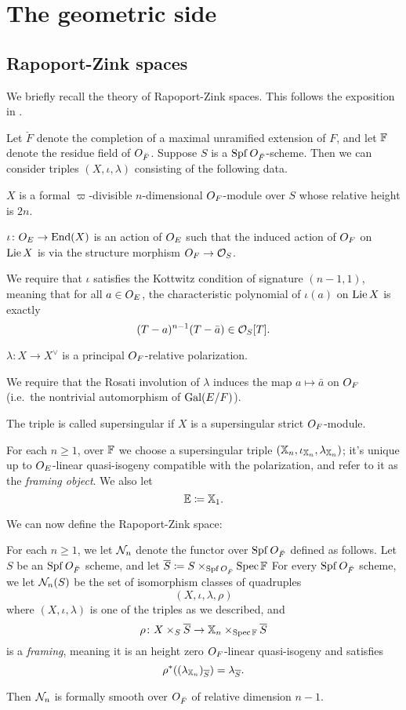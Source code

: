 \section{The geometric side}
\label{sec:geo}

\subsection{Rapoport-Zink spaces}
We briefly recall the theory of Rapoport-Zink spaces.
This follows the exposition in \cite[\S4.1]{ref:survey}.

Let $\breve F$ denote the completion of a maximal unramified extension of $F$,
and let $\mathbb F$ denote the residue field of $O_{\breve F}$.
Suppose $S$ is a $\operatorname{Spf} O_{\breve F}$-scheme.
Then we can consider triples $(X, \iota, \lambda)$ consisting of the following data.
\begin{itemize}
  \ii $X$ is a formal $\varpi$-divisible $n$-dimensional $O_F$-module over $S$
  whose relative height is $2n$.

  \ii $\iota \colon O_E \to \operatorname{End}(X)$ is an action of $O_E$
  such that the induced action of $O_F$ on $\operatorname{Lie} X$
  is via the structure morphism $O_F \to \mathcal{O}_S$.

  We require that $\iota$ satisfies the Kottwitz condition of signature $(n-1,1)$,
  meaning that for all $a \in O_E$,
  the characteristic polynomial of $\iota(a)$ on $\operatorname{Lie} X$
  is exactly \[ (T-a)^{n-1} (T-\bar a) \in \mathcal{O}_S[T]. \]

  \ii $\lambda \colon X \to X^\vee$ is a principal $O_F$-relative polarization.

  We require that the Rosati involution of $\lambda$
  induces the map $a \mapsto \bar a$ on $O_F$
  (i.e.\ the nontrivial automorphism of $\operatorname{Gal}(E/F)$).
\end{itemize}
The triple is called supersingular if $X$ is a supersingular strict $O_F$-module.

For each $n \ge 1$, over $\mathbb F$
we choose a supersingular triple $(\mathbb X_n, \iota_{\mathbb X_n}, \lambda_{\mathbb X_n})$;
it's unique up to $O_E$-linear quasi-isogeny compatible with the polarization,
and refer to it as the \emph{framing object}.
We also let \[ \mathbb E \coloneqq \mathbb X_1. \]

We can now define the Rapoport-Zink space:
\begin{definition}
  For each $n \ge 1$, we let $\mathcal N_n$ denote the
  functor over $\operatorname{Spf} O_{\breve F}$ defined as follows.
  Let $S$ be an $\operatorname{Spf} O_{\breve F}$ scheme, and let
  $\overline S \coloneqq S \times_{\operatorname{Spf} O_{\breve F}} \operatorname{Spec} \mathbb F$
  For every $\operatorname{Spf} O_{\breve F}$ scheme, we let $\mathcal N_n(S)$
  be the set of isomorphism classes of quadruples
  \[ (X, \iota, \lambda, \rho) \]
  where $(X, \iota, \lambda)$ is one of the triples as we described, and
  \[ \rho \colon X \times_S \overline S \to \mathbb X_n \times_{\operatorname{Spec} \mathbb F} \overline S \]
  is a \emph{framing}, meaning it is an height zero $O_F$-linear quasi-isogeny
  and satisfies
  \[ \rho^\ast((\lambda_{\mathbb X_n})_{\overline S}) = \lambda_{\overline S}. \]
\end{definition}
Then $\mathcal N_n$ is formally smooth over $O_{\breve F}$ of relative dimension $n-1$.

